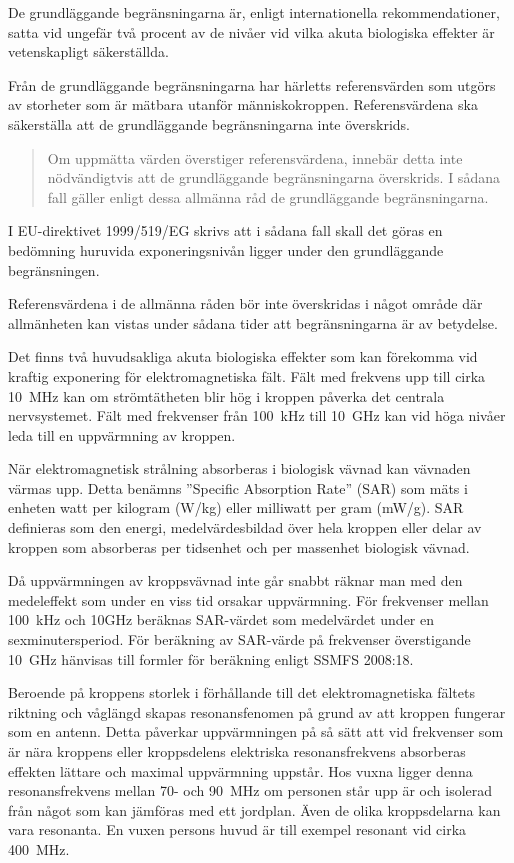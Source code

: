 De grundläggande begränsningarna är, enligt internationella rekommendationer,
satta vid ungefär två procent av de nivåer vid vilka akuta biologiska effekter
är vetenskapligt säkerställda. 

Från de grundläggande begränsningarna har härletts referensvärden som utgörs
av storheter som är mätbara utanför människokroppen.
Referensvärdena ska säkerställa att de grundläggande begränsningarna inte
överskrids.

\begin{quote}
	Om uppmätta värden överstiger referensvärdena, innebär detta inte nödvändigtvis
	att de grundläggande begränsningarna överskrids. I sådana fall gäller enligt
	dessa allmänna råd de grundläggande begränsningarna.
\end{quote}

I EU-direktivet 1999/519/EG \cite{1999/519/EG} skrivs att i sådana fall skall det
göras en bedömning huruvida exponeringsnivån ligger under den grundläggande
begränsningen.

Referensvärdena i de allmänna råden bör inte överskridas i något område där
allmänheten kan vistas under sådana tider att begränsningarna är av betydelse.

Det finns två huvudsakliga akuta biologiska effekter som kan förekomma vid
kraftig exponering för elektromagnetiska fält.
Fält med frekvens upp till cirka 10~MHz kan om strömtätheten blir hög i kroppen
påverka det centrala nervsystemet.
Fält med frekvenser från 100~kHz till 10~GHz kan vid höga nivåer leda till en
uppvärmning av kroppen.

När elektromagnetisk strålning absorberas i biologisk vävnad kan vävnaden värmas
upp.
Detta benämns ''Specific Absorption Rate'' (SAR) som mäts i enheten watt per
kilogram (W/kg) eller milliwatt per gram (mW/g).
SAR definieras som den energi, medelvärdesbildad över hela kroppen eller delar
av kroppen som absorberas per tidsenhet och per massenhet biologisk vävnad. 

Då uppvärmningen av kroppsvävnad inte går snabbt räknar man med den medeleffekt
som under en viss tid orsakar uppvärmning.
För frekvenser mellan 100~kHz och 10GHz beräknas SAR-värdet som medelvärdet under
en sexminutersperiod.
För beräkning av SAR-värde på frekvenser överstigande 10~GHz hänvisas till 
formler för beräkning enligt SSMFS 2008:18.

Beroende på kroppens storlek i förhållande till det elektromagnetiska fältets
riktning och våglängd skapas resonansfenomen på grund av att kroppen fungerar
som en antenn.
Detta påverkar uppvärmningen på så sätt att vid frekvenser som är nära kroppens
eller kroppsdelens elektriska resonansfrekvens absorberas effekten lättare och
maximal uppvärmning uppstår.
Hos vuxna ligger denna resonansfrekvens mellan 70- och 90~MHz om personen står
upp är och isolerad från något som kan jämföras med ett jordplan.
Även de olika kroppsdelarna kan vara resonanta.
En vuxen persons huvud är till exempel resonant vid cirka 400~MHz.

